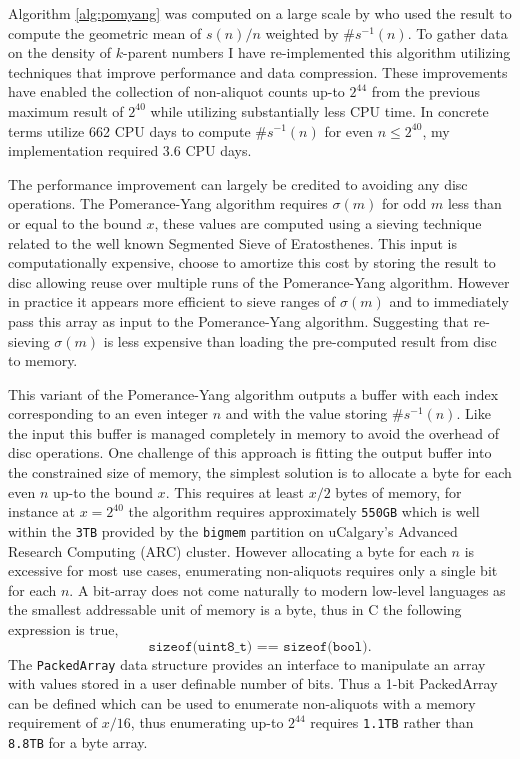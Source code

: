 \documentclass{article}
\theoremstyle{definition}
\begin{document}
Algorithm \ref{alg:pomyang} was computed on a large scale by \cite{chum_guy_jacobson_mosunov_2018} who used the result to compute the geometric mean of $s(n) / n$ weighted by $\#s^{-1}(n)$. To gather data on the density of $k$-parent numbers I have re-implemented this algorithm utilizing techniques that improve performance and data compression. These improvements have enabled the collection of non-aliquot counts up-to $2^{44}$ from the previous maximum result of $2^{40}$ while utilizing substantially less CPU time. In concrete terms \cite{chum_guy_jacobson_mosunov_2018} utilize 662 CPU days to compute $\#s^{-1}(n)$ for even $n \leq 2^{40}$, my implementation required 3.6 CPU days. 

The performance improvement can largely be credited to avoiding any disc operations. The Pomerance-Yang algorithm requires $\sigma(m)$ for odd $m$ less than or equal to the bound $x$, these values are computed using a sieving technique related to the well known Segmented Sieve of Eratosthenes. This input is computationally expensive, \cite{chum_guy_jacobson_mosunov_2018} choose to amortize this cost by storing the result to disc allowing reuse over multiple runs of the Pomerance-Yang algorithm. However in practice it appears more efficient to sieve ranges of $\sigma(m)$ and to immediately pass this array as input to the Pomerance-Yang algorithm. Suggesting that re-sieving $\sigma(m)$ is less expensive than loading the pre-computed result from disc to memory.

This variant of the Pomerance-Yang algorithm outputs a buffer with each index corresponding to an even integer $n$ and with the value storing $\#s^{-1}(n)$. Like the input this buffer is managed completely in memory to avoid the overhead of disc operations. One challenge of this approach is fitting the output buffer into the constrained size of memory, the simplest solution is to allocate a byte for each even $n$ up-to the bound $x$. This requires at least $x/2$ bytes of memory, for instance at $x = 2^{40}$ the algorithm requires approximately \texttt{550GB} which is well within the \texttt{3TB} provided by the \texttt{bigmem} partition on uCalgary's Advanced Research Computing (ARC) cluster. However allocating a byte for each $n$ is excessive for most use cases, enumerating non-aliquots requires only a single bit for each $n$. A bit-array does not come naturally to modern low-level languages as the smallest addressable unit of memory is a byte, thus in C the following expression is true,
$$\texttt{sizeof(uint8\_t) == sizeof(bool)}.$$
The \texttt{PackedArray} data structure \cite{packedArray} provides an interface to manipulate an array with values stored in a user definable number of bits. Thus a 1-bit PackedArray can be defined which can be used to enumerate non-aliquots with a memory requirement of $x/16$, thus enumerating up-to $2^{44}$ requires \texttt{1.1TB} rather than \texttt{8.8TB} for a byte array.
\end{document}
